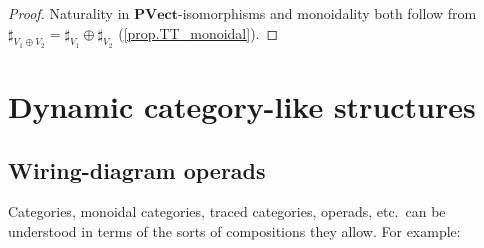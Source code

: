 \documentclass[11pt, oneside, article]{memoir}
\theoremstyle{definition}
\theoremstyle{plain}
\newcommand{\Cat}[1]{\mathbf{#1}}%
\newcommand{\pvect}{\Cat{PVect}}
\begin{document}
\begin{proof}
Naturality in $\pvect$-isomorphisms and monoidality both follow from $\sharp_{V_1\oplus V_2}=\sharp_{V_1}\oplus\sharp_{V_2}$ (\cref{prop.TT_monoidal}).
\end{proof}

\section{Dynamic category-like structures}\label{sec.dynamic_structures}

\subsection{Wiring-diagram operads}\label{sec.wd_operads}

Categories, monoidal categories, traced categories, operads, etc.\ can be understood in terms of the sorts of compositions they allow. For example:
\end{document}
